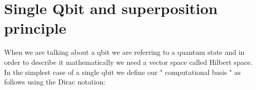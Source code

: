 \chapter{Single Qbit and superposition principle}
When we are talking about a qbit we are referring to a quantum state and in order to describe it mathematically we need a vector space called Hilbert space.\\
In the simplest case of a single qbit we define our " computational basis " as follows using the Dirac notation:
